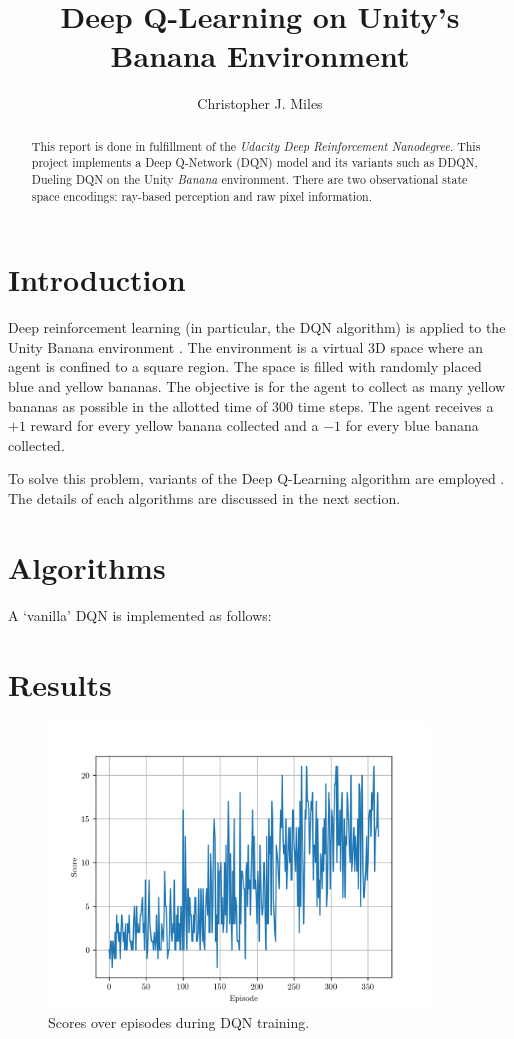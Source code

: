 \documentclass[12]{article}
\begin{document}
\title{Deep Q-Learning on Unity's Banana Environment}
\author{Christopher J. Miles}
\maketitle

\begin{abstract}
This report is done in fulfillment of the {\it Udacity Deep Reinforcement Nanodegree}. This project implements a Deep Q-Network (DQN) model and its variants such as DDQN, Dueling DQN on the Unity {\it Banana} environment. There are two observational state space encodings: ray-based perception and raw pixel information.
\end{abstract}




\section{Introduction}

Deep reinforcement learning (in particular, the DQN algorithm) is applied to the Unity Banana environment \cite{unity}.  The environment is a virtual 3D space where an agent is confined to a square region. The space is filled with randomly placed blue and yellow bananas. The objective is for the agent to collect as many yellow bananas as possible in the allotted time of 300 time steps. The agent receives a $+1$ reward for every yellow banana collected and a $-1$ for every blue banana collected. 

To solve this problem, variants of the Deep Q-Learning algorithm are employed \cite{Wang2016,Schaul2016,Mnih2015}. The details of each algorithms are discussed in the next section.

\section{Algorithms}

A `vanilla' DQN \cite{Mnih2015} is implemented as follows:

\section{Results}

\begin{figure}
\includegraphics[width=0.9\textwidth]{images/scores_dqn}
\caption{Scores over episodes during DQN training.}
\end{figure}


\end{document}

